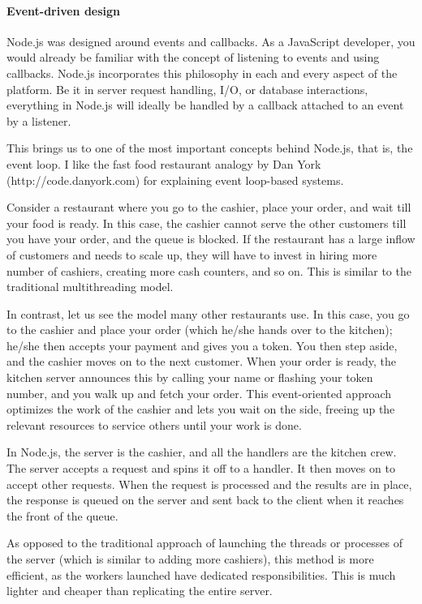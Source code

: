 \paragraph*{Event-driven design}
\hfill \break
Node.js was designed around events and callbacks. As a JavaScript developer, you
would already be familiar with the concept of listening to events and using callbacks.
Node.js incorporates this philosophy in each and every aspect of the platform. Be it
in server request handling, I/O, or database interactions, everything in Node.js will
ideally be handled by a callback attached to an event by a listener.\cite{16}

This brings us to one of the most important concepts behind Node.js, that is, the event
loop. I like the fast food restaurant analogy by Dan York (http://code.danyork.com)
for explaining event loop-based systems.\cite{16}

Consider a restaurant where you go to the cashier, place your order, and wait till
your food is ready. In this case, the cashier cannot serve the other customers till you
have your order, and the queue is blocked. If the restaurant has a large inflow of
customers and needs to scale up, they will have to invest in hiring more number of
cashiers, creating more cash counters, and so on. This is similar to the traditional
multithreading model.\cite{16}

In contrast, let us see the model many other restaurants use. In this case, you go
to the cashier and place your order (which he/she hands over to the kitchen);
he/she then accepts your payment and gives you a token. You then step aside, and
the cashier moves on to the next customer. When your order is ready, the kitchen
server announces this by calling your name or flashing your token number, and you
walk up and fetch your order. This event-oriented approach optimizes the work of
the cashier and lets you wait on the side, freeing up the relevant resources to service
others until your work is done.\cite{16}

In Node.js, the server is the cashier, and all the handlers are the kitchen crew. The
server accepts a request and spins it off to a handler. It then moves on to accept other
requests. When the request is processed and the results are in place, the response is
queued on the server and sent back to the client when it reaches the front of the queue.\cite{16}

As opposed to the traditional approach of launching the threads or processes of the
server (which is similar to adding more cashiers), this method is more efficient, as the
workers launched have dedicated responsibilities. This is much lighter and cheaper
than replicating the entire server.\cite{16}


